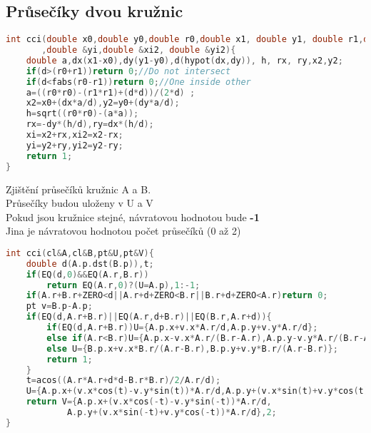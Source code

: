 \documentclass[11pt]{article}
\begin{document}
\subsection{Průsečíky dvou kružnic}
\begin{lstlisting}[language=C++]
int cci(double x0,double y0,double r0,double x1, double y1, double r1,double &xi
       ,double &yi,double &xi2, double &yi2){
    double a,dx(x1-x0),dy(y1-y0),d(hypot(dx,dy)), h, rx, ry,x2,y2;
    if(d>(r0+r1))return 0;//Do not intersect
    if(d<fabs(r0-r1))return 0;//One inside other
    a=((r0*r0)-(r1*r1)+(d*d))/(2*d) ;
    x2=x0+(dx*a/d),y2=y0+(dy*a/d);
    h=sqrt((r0*r0)-(a*a));
    rx=-dy*(h/d),ry=dx*(h/d);
    xi=x2+rx,xi2=x2-rx;
    yi=y2+ry,yi2=y2-ry;
    return 1;
}
\end{lstlisting}
Zjištění průsečíků kružnic \textsf{A} a \textsf{B}.
\\Průsečíky budou uloženy v \textsf{U} a \textsf{V}
\\Pokud jsou kružnice stejné, návratovou hodnotou bude \textbf{-1}
\\Jina je návratovou hodnotou počet průsečíků (0 až 2)
\begin{lstlisting}[language=C++]
int cci(cl&A,cl&B,pt&U,pt&V){
    double d(A.p.dst(B.p)),t;
    if(EQ(d,0)&&EQ(A.r,B.r))
        return EQ(A.r,0)?(U=A.p),1:-1;
    if(A.r+B.r+ZERO<d||A.r+d+ZERO<B.r||B.r+d+ZERO<A.r)return 0;
    pt v=B.p-A.p;
    if(EQ(d,A.r+B.r)||EQ(A.r,d+B.r)||EQ(B.r,A.r+d)){
        if(EQ(d,A.r+B.r))U={A.p.x+v.x*A.r/d,A.p.y+v.y*A.r/d};
        else if(A.r<B.r)U={A.p.x-v.x*A.r/(B.r-A.r),A.p.y-v.y*A.r/(B.r-A.r)};
        else U={B.p.x+v.x*B.r/(A.r-B.r),B.p.y+v.y*B.r/(A.r-B.r)};
        return 1;
    }
    t=acos((A.r*A.r+d*d-B.r*B.r)/2/A.r/d);
    U={A.p.x+(v.x*cos(t)-v.y*sin(t))*A.r/d,A.p.y+(v.x*sin(t)+v.y*cos(t))*A.r/d};
    return V={A.p.x+(v.x*cos(-t)-v.y*sin(-t))*A.r/d,
    		A.p.y+(v.x*sin(-t)+v.y*cos(-t))*A.r/d},2;
}
\end{lstlisting}
\end{document}
